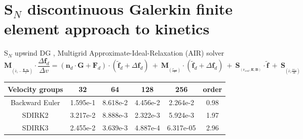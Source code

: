 \documentclass[8pt, compress]{beamer}
\newcommand{\pdv}[2]{\frac{\partial{#1}}{\partial{#2}}}
\newcommand{\vect}[1]{\boldsymbol{#1}}
\newcommand{\matr}[1]{\mathbf{#1}}
\newcommand{\nue}{\nu_{e}}
\newcommand{\nuscat}{\nu_{scat}}
\newcommand{\vmag}{v}
\newcommand{\vn}{\vect{n}}
\newcommand{\E}{\vect{E}}
\newcommand{\B}{\vect{B}}
\newcommand{\fM}{f_M}
\newcommand{\fzero}{f_0}
\begin{document}
\section{S$_N$ discontinuous Galerkin finite element approach to kinetics}
\newcommand{\fs}{0.45}

\begin{frame}
\begin{center}
{\Large S$_N$ upwind DG
    , Multigrid Approximate-Ideal-Relaxation (AIR) solver
}
\begin{equation}
  \matr{M}_{_{(\tilde{\nue} - \frac{\E\cdot\vn_d}{\vmag})}}\cdot 
  \frac{\Delta \vect{f}_d}{\Delta \vmag}
  =
  \left(\vn_d\cdot\matr{G} + \matr{F}_d\right) \cdot 
  \left(\tilde{\vect{f}}_d + \Delta \vect{f}_d\right) 
  ~+~ \matr{M}_{_{(\frac{\nuscat}{\vmag})}}\cdot 
  \left(\tilde{\vect{f}}_d + \Delta \vect{f}_d\right)
  ~+~ \matr{S}_{_{(\nuscat, \E, \B)}} \cdot \tilde{\vect{f}}
  ~+~ \vect{S}_{_{(\tilde{\nue}\pdv{\fM}{\vmag})}}
  \nonumber
\end{equation}

\begin{tabular}{c|ccccc}
    Velocity groups       & 32   & 64 & 128 & 256 & order \\
    \hline
	Backward Euler & 1.595e-1 & 8.618e-2 & 4.456e-2 & 2.264e-2 & 0.98 \\
    SDIRK2         & 3.217e-2 & 8.888e-3 & 2.322e-3 & 5.924e-3 & 1.97 \\
    SDIRK3         & 2.455e-2 & 3.639e-3 & 4.887e-4 & 6.317e-05 & 2.96 \\
\end{tabular}



\end{center}
\end{frame}
\end{document}
